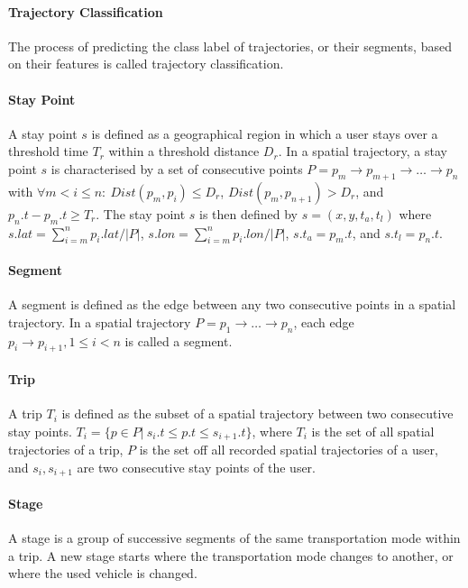 \paragraph{Trajectory Classification} The process of predicting the class label of trajectories, or their segments, based on their features is called trajectory classification. \cite{lee2008traclass}

\paragraph{Stay Point} A stay point $s$ is defined as a geographical region in which a user stays over a threshold time $T_r$ within a threshold distance $D_r$. In a spatial trajectory, a stay point $s$ is characterised by a set of consecutive points $P=p_m \rightarrow p_{m+1} \rightarrow \dots \rightarrow p_n$ with $\forall m<i\leq n:\: Dist(p_m, p_i) \leq D_r$, $Dist(p_m, p_{n+1}) > D_r $, and $p_n.t - p_m.t \geq T_r$. The stay point $s$ is then defined by $s=(x, y, t_a, t_l)$ where $s.lat = \sum^{n}_{i=m}p_i.lat /|P|$, $s.lon = \sum^{n}_{i=m}p_i.lon /|P|$, $s.t_a = p_m.t$, and $s.t_l = p_n.t$. \cite{Zheng2007}

\paragraph{Segment} A segment is defined as the edge between any two consecutive points in a spatial trajectory. In a spatial trajectory $P=p_1 \rightarrow \dots \rightarrow p_n$, each edge $p_i\rightarrow p_{i+1}, 1\leq i < n$ is called a segment. \cite{Zheng:2015:TDM:2764959.2743025}

\paragraph{Trip} A trip $T_i$ is defined as the subset of a spatial trajectory between two consecutive stay points. $T_i = \{p \in P |\: s_i.t \leq p.t \leq s_{i+1}.t \}$, where $T_i$ is the set of all spatial trajectories of a trip, $P$ is the set off all recorded spatial trajectories of a user, and $s_i, s_{i+1}$ are two consecutive stay points of the user. \cite{Zheng2008}

\paragraph{Stage} A stage is a group of successive segments of the same transportation mode within a trip. A new stage starts where the transportation mode changes to another, or where the used vehicle is changed. \cite{Bolbol2012}

